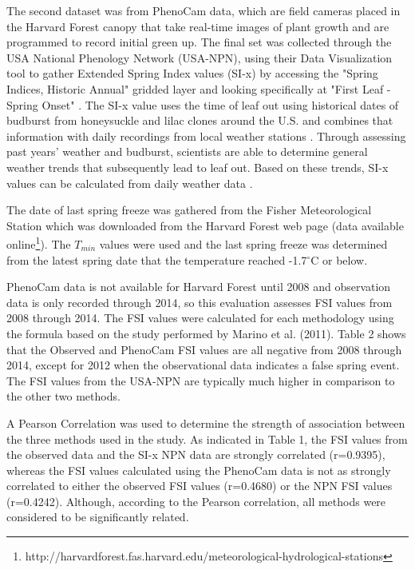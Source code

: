 \documentclass{article}\usepackage[]{graphicx}\usepackage[]{color}
\begin{document}
The second dataset was from PhenoCam data, which are field cameras placed in the Harvard Forest canopy that take real-time images of plant growth and are programmed to record initial green up. The final set was collected through the USA National Phenology Network (USA-NPN), using their Data Visualization tool to gather Extended Spring Index values (SI-x) by accessing the "Spring Indices, Historic Annual" gridded layer and looking specifically at "First Leaf - Spring Onset" \citep{SI-x2016}. The SI-x value uses the time of leaf out using historical dates of budburst from honeysuckle and lilac clones around the U.S. and combines that information with daily recordings from local weather stations \citep{USA-NPN2016, Ault2015, Ault2015a, Schwartz2013, Schwartz1997}. 
Through assessing past years' weather and budburst, scientists are able to determine general weather trends that subsequently lead to leaf out. Based on these trends, SI-x values can be calculated from daily weather data \citep{USA-NPN2016}.
\par
The date of last spring freeze was gathered from the Fisher Meteorological Station which was downloaded from the Harvard Forest web page (data available online\footnote{http://harvardforest.fas.harvard.edu/meteorological-hydrological-stations}). The $T_{min}$ values were used and the last spring freeze was determined from the latest spring date that the temperature reached -1.7$^{\circ}$C or below. 
\par
PhenoCam data is not available for Harvard Forest until 2008 and observation data is only recorded through 2014, so this evaluation assesses FSI values from 2008 through 2014.
The FSI values were calculated for each methodology using the formula based on the study performed by Marino et al. (2011). Table 2 shows that the Observed and PhenoCam FSI values are all negative from 2008 through 2014, except for 2012 when the observational data indicates a false spring event. The FSI values from the USA-NPN are typically much higher in comparison to the other two methods.  
\par
A Pearson Correlation was used to determine the strength of association between the three methods used in the study. As indicated in Table 1, the FSI values from the observed data and the SI-x NPN data are strongly correlated (r=0.9395), whereas the FSI values calculated using the PhenoCam data is not as strongly correlated to either the observed FSI values (r=0.4680) or the NPN FSI values (r=0.4242). Although, according to the Pearson correlation, all methods were considered to be significantly related. 
\end{document}
